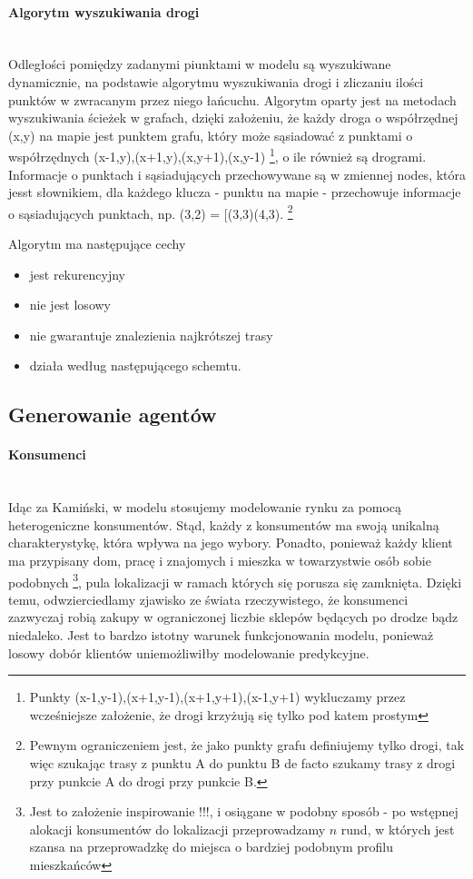 \documentclass{article}
\begin{document}
\paragraph{Algorytm wyszukiwania drogi} \mbox{}\\

Odległości pomiędzy zadanymi piunktami w modelu są wyszukiwane dynamicznie, na podstawie algorytmu wyszukiwania drogi i zliczaniu ilości punktów w zwracanym przez niego łańcuchu. Algorytm oparty jest na metodach wyszukiwania ścieżek w grafach, dzięki założeniu, że każdy droga o współrzędnej (x,y) na mapie jest punktem grafu, który może sąsiadować z punktami o współrzędnych (x-1,y),(x+1,y),(x,y+1),(x,y-1) \footnote{Punkty (x-1,y-1),(x+1,y-1),(x+1,y+1),(x-1,y+1) wykluczamy przez wcześniejsze założenie, że drogi krzyżują się tylko pod katem prostym}, o ile również są drogrami. Informacje o punktach i sąsiadujących przechowywane są w zmiennej nodes, która jesst słownikiem, dla każdego klucza - punktu na mapie - przechowuje informacje o sąsiadujących punktach, np. (3,2) = [(3,3)(4,3). \footnote{Pewnym ograniczeniem jest, że jako punkty grafu definiujemy tylko drogi, tak więc szukając trasy z punktu A do punktu B de facto szukamy trasy z drogi przy punkcie A do drogi przy punkcie B.}

Algorytm ma następujące cechy

	\begin{itemize}
		\item jest rekurencyjny
		\item nie jest losowy
		\item nie gwarantuje znalezienia najkrótszej trasy
		\item działa według następującego schemtu.
	\end{itemize}

\subsection{Generowanie agentów}
\paragraph{Konsumenci} \mbox{}\\

Idąc za Kamiński, w modelu stosujemy modelowanie rynku za pomocą heterogeniczne konsumentów. Stąd, każdy z konsumentów ma swoją unikalną charakterystykę, która wpływa na jego wybory. Ponadto, ponieważ każdy klient ma przypisany dom, pracę i znajomych i mieszka w towarzystwie osób sobie podobnych  \footnote{Jest to założenie inspirowanie !!!, i osiągane w podobny sposób - po wstępnej alokacji konsumentów do lokalizacji przeprowadzamy $n$ rund, w których jest szansa na przeprowadzkę do miejsca o bardziej podobnym profilu mieszkańców}, pula lokalizacji w ramach których się porusza się zamknięta. Dzięki temu, odwzierciedlamy zjawisko ze świata rzeczywistego, że konsumenci zazwyczaj robią zakupy w ograniczonej liczbie sklepów będących po drodze bądz niedaleko. Jest to bardzo istotny warunek funkcjonowania modelu, ponieważ losowy dobór klientów uniemożliwiłby modelowanie predykcyjne.
\end{document}
